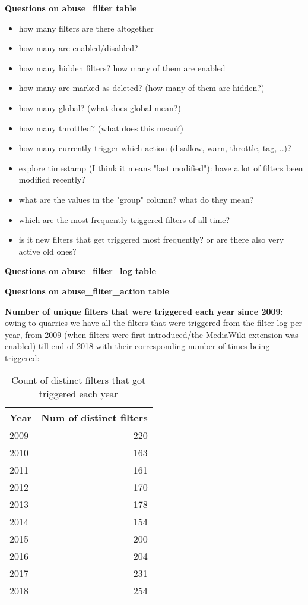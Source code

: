 \documentclass{sigchi}
\begin{document}
\textbf{Questions on abuse\_filter table}
\begin{itemize}
    \item how many filters are there altogether
    \item how many are enabled/disabled?
    \item how many hidden filters? how many of them are enabled
    \item how many are marked as deleted? (how many of them are hidden?)
    \item how many global? (what does global mean?)
    \item how many throttled? (what does this mean?)
    \item how many currently trigger which action (disallow, warn, throttle, tag, ..)?
    \item explore timestamp (I think it means "last modified"): have a lot of filters been modified recently?
    \item what are the values in the "group" column? what do they mean?
    \item which are the most frequently triggered filters of all time?
    \item is it new filters that get triggered most frequently? or are there also very active old ones?
\end{itemize}

\textbf{Questions on abuse\_filter\_log table}

\textbf{Questions on abuse\_filter\_action table}

\textbf{Number of unique filters that were triggered each year since 2009:}
owing to quarries we have all the filters that were triggered from the filter log per year, from 2009 (when filters were first introduced/the MediaWiki extension was enabled) till end of 2018 with their corresponding number of times being triggered:
\begin{table}
  \centering
  \begin{tabular}{l r }
    Year & Num of distinct filters \\  
    \hline
    2009 & 220 \\
    2010 & 163 \\
    2011 & 161 \\
    2012 & 170 \\
    2013 & 178 \\
    2014 & 154 \\
    2015 & 200 \\
    2016 & 204 \\
    2017 & 231 \\
    2018 & 254 \\
  \end{tabular}
  \caption{Count of distinct filters that got triggered each year}~\label{tab:active-filters-count}
\end{table}
\end{document}
